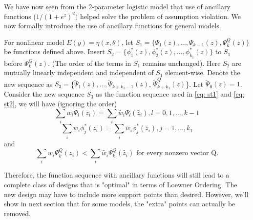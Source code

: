 \documentclass[11pt]{amsart}
\theoremstyle{definition}
\theoremstyle{remark}
\begin{document}
 


We have now seen from the 2-parameter logistic model that use of ancillary functions ($1/(1+e^z)^2)$ helped solve the problem of assumption violation. We now formally introduce the use of ancillary functions for general models. 

 
 
For nonlinear model $E(y) = \eta(x,\theta)$, let $S_1 = \{\Psi_1(z), \ldots,\Psi_{k-1}(z) ,\Psi_k^Q(z)\}$ be functions defined above. Insert $ S_2 =\{\phi^*_1(z), \phi^*_2(z),\ldots, \phi^*_{k_1}(z)\}$ to $S_1$ before  $\Psi_k^Q(z)$. (The order of the terms in $S_1$ remains unchanged). Here $S_2$ are mutually linearly independent and independent of  $S_1$ element-wise. Denote the new sequence as  $S_3 = $\{$\tilde{\Psi}_1(z), \ldots,\tilde{\Psi}_{k+k_1-1}(z)$, $\tilde{\Psi}_{k+k_1}^Q(z)$\}. Let $\tilde{\Psi}_0(z) = 1$. Consider the new sequence $S_3$ as the function sequence used in \eqref{eq: st1} and \eqref{eq: st2}, we will have (ignoring the order) \begin{equation}\label{eq: added1}
\sum_{i}w_i\Psi_l(z_i)=\sum_{i}\tilde{w_i}\Psi_l(\tilde{z_i}), l=0,1,\ldots, k-1    
\end{equation}
\begin{equation}\label{eq: added2}
\sum_{i}w_i\phi_j^*(z_i)=\sum_{i}\tilde{w_i}\phi_j^*(\tilde{z_i}), j=1,\ldots, k_1    
\end{equation}and \begin{equation}\label{eq: added3}
\sum_{i}w_i\Psi_k^Q(z_i)<\sum_{i}\tilde{w_i}\Psi_k^Q(\tilde{z_i}) \text{  for every nonzero vector Q}.
\end{equation} 

Therefore, the function sequence with ancillary functions will still lead to a complete class of designs that is "optimal" in terms of Loewner Ordering. The new design may have to include more support points than desired. However, we'll show in next section that for some models, the "extra" points can actually be removed.
\end{document}
